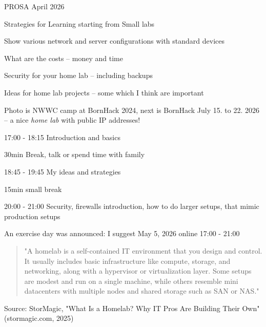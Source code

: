 \documentclass[Screen16to9,17pt]{foils}
\begin{document}
{PROSA April 2026}


\hlkprofiluk




\begin{list2}
\item Strategies for Learning starting from Small labs
\item Show various network and server configurations with standard devices
\item What are the costs -- money and time
\item Security for your home lab -- including backups
\item Ideas for home lab projects -- some which I think are important
\end{list2}

Photo is NWWC camp at BornHack 2024, next is BornHack July 15. to 22. 2026 \\
-- a nice \emph{home lab} with public IP addresses!




\begin{list2}
\item 17:00 - 18:15 Introduction and basics
\item 30min Break, talk or spend time with family
\item 18:45 - 19:45 My ideas and strategies
\item 15min small break
\item 20:00 - 21:00 Security, firewalls introduction, how to do larger setups, that mimic production setups
\end{list2}

An exercise day was announced: I suggest May 5, 2026 online 17:00 - 21:00






\begin{quote}
"A homelab is a self-contained IT environment that you design and control. It usually includes basic infrastructure like compute, storage, and networking, along with a hypervisor or virtualization layer. Some setups are modest and run on a single machine, while others resemble mini datacenters with multiple nodes and shared storage such as SAN or NAS."
\end{quote}
Source: StorMagic, "What Is a Homelab? Why IT Pros Are Building Their Own" (stormagic.com, 2025)
\end{document}
